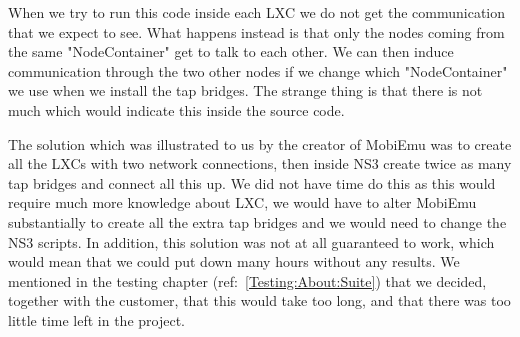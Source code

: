 	When we try to run this code inside each \gls{LXC} we do not get the communication that we expect to see. What happens instead is that only the nodes coming from the same "NodeContainer" get to talk to each other. We can then induce communication through the two other nodes if we change which "NodeContainer" we use when we install the tap bridges. The strange thing is that there is not much which would indicate this inside the source code.
	
	The solution which was illustrated to us by the creator of MobiEmu was to create all the LXCs with two network connections, then inside NS3 create twice as many tap bridges and connect all this up. We did not have time do this as this would require much more knowledge about LXC, we would have to alter MobiEmu substantially to create all the extra tap bridges and we would need to change the NS3 scripts. In addition, this solution was not at all guaranteed to work, which would mean that we could put down many hours without any results. We mentioned in the testing chapter (ref:~\ref{Testing:About:Suite}) that we decided, together with the customer, that this would take too long, and that there was too little time left in the project.
